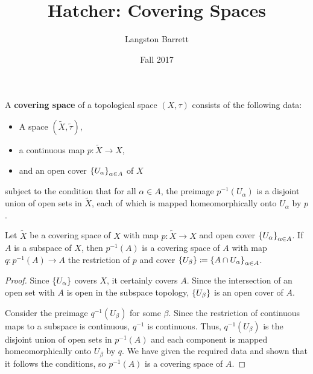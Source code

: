 \documentclass[a5paper]{article}
\newcommand{\wt}{\widetilde}
\begin{document}
\title{Hatcher: Covering Spaces}
\author{Langston Barrett}
\date{Fall 2017}

\begin{definition*}
	A \textbf{covering space} of a topological space $(X,\tau)$ consists of the
  following data:
  \begin{itemize}
    \itemsep0em
    \item A space $(\widetilde{X},\widetilde{\tau})$,
    \item a continuous map $p:\widetilde{X}\to X$,
    \item and an open cover $\left\{U_\alpha\right\}_{\alpha\in A}$ of $X$
  \end{itemize}
  subject to the condition that for all $\alpha\in A$, the preimage
  $p^{-1}(U_\alpha)$ is a disjoint union of open sets in $\widetilde{X}$, each of
  which is mapped homeomorphically onto $U_\alpha$ by $p$.
\end{definition*}
\begin{proposition*}
	Let $\wt{X}$ be a covering space of $X$ with map $p:\widetilde{X}\to X$ and
  open cover $\left\{U_\alpha\right\}_{\alpha\in A}$. If $A$ is a subspace of $X$, then
  $p^{-1}(A)$ is a covering space of $A$ with map $q:p^{-1}(A)\to A$
  the restriction of $p$ and cover
  $\left\{U_\beta\right\}\coloneqq \left\{A\cap U_\alpha\right\}_{\alpha\in A}$.
\end{proposition*}
\begin{proof}
  Since $\left\{U_\alpha\right\}$ covers $X$, it certainly covers $A$. Since the
  intersection of an open set with $A$ is open in the subspace topology,
  $\left\{U_\beta\right\}$ is an open cover of $A$.

  Consider the preimage $q^{-1}(U_\beta)$ for some $\beta$.
  Since the restriction of continuous maps to a subspace is continuous,
  $q^{-1}$ is continuous. Thus, $q^{-1}(U_\beta)$ is the disjoint union of open
  sets in $p^{-1}(A)$ and each component is mapped homeomorphically onto
  $U_\beta$ by $q$. We have given the required data and shown that it follows
  the conditions, so $p^{-1}(A)$ is a covering space of $A$.
\end{proof}

\end{document}
